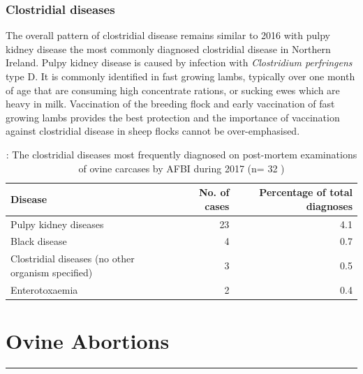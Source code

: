 \documentclass[]{book}
\begin{document}
\subsection{Clostridial diseases}\label{clostridial-diseases-1}

The overall pattern of clostridial disease remains similar to 2016 with
pulpy kidney disease the most commonly diagnosed clostridial disease in
Northern Ireland. Pulpy kidney disease is caused by infection with
\emph{Clostridium perfringens} type D. It is commonly identified in fast
growing lambs, typically over one month of age that are consuming high
concentrate rations, or sucking ewes which are heavy in milk.
Vaccination of the breeding flock and early vaccination of fast growing
lambs provides the best protection and the importance of vaccination
against clostridial disease in sheep flocks cannot be over-emphasised.

\begin{table}

\caption{\label{tab:unnamed-chunk-105}: The clostridial diseases most frequently diagnosed on post-mortem examinations of ovine carcases by AFBI during 2017 (n= 32 )}
\centering
\begin{tabular}[t]{l|r|r}
\hline
Disease & No. of cases & Percentage of total diagnoses\\
\hline
Pulpy kidney diseases & 23 & 4.1\\
\hline
Black disease & 4 & 0.7\\
\hline
Clostridial diseases (no other organism specified) & 3 & 0.5\\
\hline
Enterotoxaemia & 2 & 0.4\\
\hline
\end{tabular}
\end{table}

\chapter{Ovine Abortions}\label{ovine-abortions}

\begin{center}\rule{0.5\linewidth}{\linethickness}\end{center}
\end{document}
